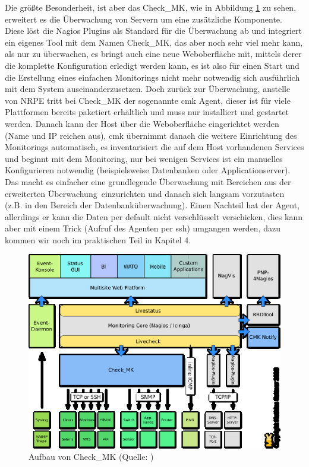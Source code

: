 \documentclass[12pt,a4paper,parskip,listof=totoc,bibliography=totoc]{scrreprt}
\begin{document}
	Die größte Besonderheit, ist aber das Check\_MK, wie in Abbildung \ref{fig:checkmkaufbau} zu sehen, erweitert es die Überwachung von Servern um eine zusätzliche Komponente. Diese löst die Nagios Plugins als Standard für die Überwachung ab und integriert ein eigenes Tool mit dem Namen Check\_MK, das aber noch sehr viel mehr kann, als nur zu überwachen, es bringt auch eine neue Weboberfläche mit, mittels derer die komplette Konfiguration erledigt werden kann, es ist also für einen Start und die Erstellung eines einfachen Monitorings nicht mehr notwendig sich ausführlich mit dem System auseinanderzusetzen. Doch zurück zur Überwachung, anstelle von NRPE tritt bei Check\_MK der sogenannte \acrlong{cmk} Agent, dieser ist für viele Plattformen bereits paketiert erhältlich und muss nur installiert und gestartet werden. Danach kann der Host über die Weboberfläche eingerichtet werden (Name und IP reichen aus), \acrlong{cmk} übernimmt danach die weitere Einrichtung des Monitorings automatisch, es inventarisiert die auf dem Host vorhandenen Services und beginnt mit dem Monitoring, nur bei wenigen Services ist ein manuelles Konfigurieren notwendig (beispielsweise Datenbanken oder Applicationserver). Das macht es einfacher eine grundlegende Überwachung mit Bereichen aus der \glqq erweiterten Überwachung\grqq\ einzurichten und danach sich langsam vorzutasten (z.B. in den Bereich der Datenbanküberwachung). Einen Nachteil hat der Agent, allerdings er kann die Daten per default nicht verschlüsselt verschicken, dies kann aber mit einem Trick (Aufruf des Agenten per ssh) umgangen werden, dazu kommen wir noch im praktischen Teil in Kapitel 4.
	\begin{figure}
		\centering
		\includegraphics[width=1\textwidth]{pics/OMD_Schema.eps}
		\caption[Aufbau von Check\_MK]{Aufbau von Check\_MK (Quelle: \cite{checkmk})}
		\label{fig:checkmkaufbau}
	\end{figure}
	\clearpage
\end{document}
